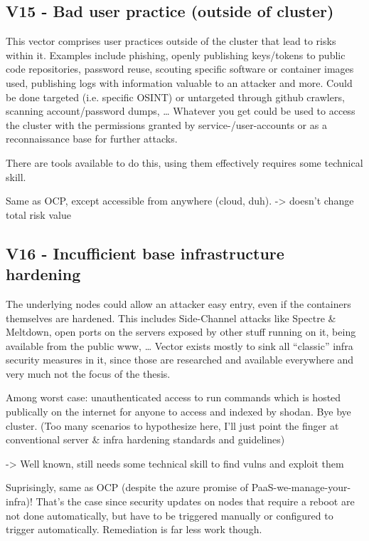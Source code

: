 \subsection{V15 - Bad user practice (outside of cluster)}
This vector comprises user practices outside of the cluster that lead to risks within it. Examples include phishing, openly publishing keys/tokens to public code repositories, password reuse, scouting specific software or container images used, publishing logs with information valuable to an attacker and more.
Could be done targeted (i.e. specific OSINT) or untargeted through github crawlers, scanning account/password dumps, …
Whatever you get could be used to access the cluster with the permissions granted by service-/user-accounts or as a reconnaissance base for further attacks.

There are tools available to do this, using them effectively requires some technical skill.

Same as OCP, except accessible from anywhere (cloud, duh).
-> doesn’t change total risk value

\subsection{V16 - Incufficient base infrastructure hardening}
The underlying nodes could allow an attacker easy entry, even if the containers themselves are hardened. This includes Side-Channel attacks like Spectre \& Meltdown, open ports on the servers exposed by other stuff running on it, being available from the public www, …
Vector exists mostly to sink all “classic” infra security measures in it, since those are researched and available everywhere and very much not the focus of the thesis.

Among worst case: unauthenticated access to run commands which is hosted publically on the internet for anyone to access and indexed by shodan. Bye bye cluster.
(Too many scenarios to hypothesize here, I’ll just point the finger at conventional server \& infra hardening standards and guidelines)

-> Well known, still needs some technical skill to find vulns and exploit them

Suprisingly, same as OCP (despite the azure promise of PaaS-we-manage-your-infra)!
That’s the case since security updates on nodes that require a reboot are not done automatically, but have to be triggered manually or configured to trigger automatically.
Remediation is far less work though.

